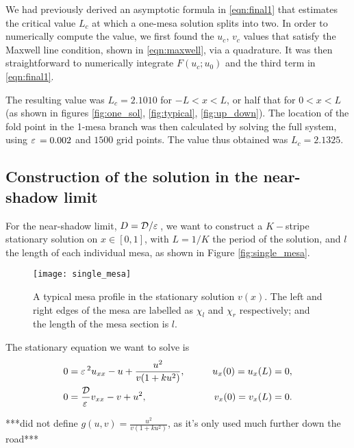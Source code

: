 We had previously derived an asymptotic formula in \eqref{eqn:final1} that estimates the critical value $L_c$ at which a one-mesa solution splits into two. In order to numerically compute the value, we first found the $u_c$, $v_c$ values that satisfy the Maxwell line condition, shown in \eqref{eqn:maxwell}, via a quadrature. It was then straightforward to numerically integrate $F(u_c;u_0)$ and the third term in \eqref{eqn:final1}. 

The resulting value was $L_c = 2.1010$ for $-L<x<L$, or half that for $0<x<L$ (as shown in figures \ref{fig:one_sol}, \ref{fig:typical}, \ref{fig:up_down}). The location of the fold point in the 1-mesa branch was then calculated by solving the full system, using $\varepsilon\,=0.002$ and $1500$ grid points. The value thus obtained was $L_c = 2.1325$.


\subsection{Construction of the solution in the near-shadow limit}

For the near-shadow limit, $D=\mathcal{D}/\varepsilon\,$, we want to construct a $K-$stripe stationary solution on $x\in[0,1]$, with $L=1/K$ the period of the solution, and $l$ the length of each individual mesa, as shown in Figure \eqref{fig:single_mesa}.
% 
\begin{figure}[htb]
\begin{center}
\texttt{[image: single\_mesa]}
\caption{A typical mesa profile in the stationary solution $v(x)$. The left and right edges of the mesa are labelled as $\chi_l$ and $\chi_r$ respectively; and the length of the mesa section is $l$.}
\label{fig:single_mesa}
\end{center}
\end{figure}
% 
The stationary equation we want to solve is
% 
\begin{equation}
\label{eqn:o-gms_stat}
\begin{split}
\begin{aligned}
	0 &= \varepsilon\,^2 u_{xx} -u + \frac{u^2}{v(1+ku^2)},\qquad &u_x(0)=u_x(L)=0, \\
	0 &= \frac{\mathcal{D}}{\varepsilon\,}v_{xx} - v + u^2,\qquad &v_x(0)=v_x(L)=0.
\end{aligned}
\end{split}
\end{equation}
% 

***did not define $g(u,v)=\frac{u^2}{v(1+ku^2)}$, as it's only used much further down the road***

